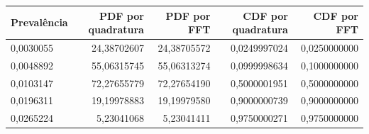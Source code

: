 \begin{tabular}{lrrrr}
\toprule
Prevalência & PDF por quadratura & PDF por FFT & CDF por quadratura & CDF por FFT \\
\midrule
0,0030055 & 24,38702607 & 24,38705572 & 0,0249997024 & 0,0250000000 \\
0,0048892 & 55,06315745 & 55,06313274 & 0,0999998634 & 0,1000000000 \\
0,0103147 & 72,27655779 & 72,27654190 & 0,5000001951 & 0,5000000000 \\
0,0196311 & 19,19978883 & 19,19979580 & 0,9000000739 & 0,9000000000 \\
0,0265224 & 5,23041068 & 5,23041411 & 0,9750000271 & 0,9750000000 \\
\bottomrule
\end{tabular}
